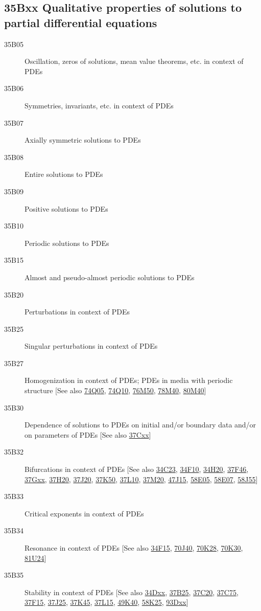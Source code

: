 \documentclass[letterpaper]{article}
\begin{document}
\subsection*{35Bxx  Qualitative properties of solutions to partial differential equations }\label{35Bxx}
\begin{description}  
\item [35B05]\label{35B05} Oscillation, zeros of solutions, mean value theorems, etc. in context of PDEs
\item [35B06]\label{35B06} Symmetries, invariants, etc. in context of PDEs 
\item [35B07]\label{35B07} Axially symmetric solutions to PDEs
\item [35B08]\label{35B08} Entire solutions to PDEs
\item [35B09]\label{35B09} Positive solutions to PDEs
\item [35B10]\label{35B10} Periodic solutions  to PDEs
\item [35B15]\label{35B15} Almost and pseudo-almost periodic solutions to PDEs
\item [35B20]\label{35B20} Perturbations in context of PDEs
\item [35B25]\label{35B25} Singular perturbations in context of PDEs
\item [35B27]\label{35B27} Homogenization in context of PDEs; PDEs in media with periodic structure [See also \hyperref[74Q05]{74Q05}, \hyperref[74Q10]{74Q10}, \hyperref[76M50]{76M50}, \hyperref[78M40]{78M40}, \hyperref[80M40]{80M40}]
\item [35B30]\label{35B30} Dependence of solutions to PDEs on initial and/or boundary data and/or on parameters of PDEs [See also \hyperref[37Cxx]{37Cxx}]
\item [35B32]\label{35B32} Bifurcations  in context of PDEs [See also \hyperref[34C23]{34C23}, \hyperref[34F10]{34F10}, \hyperref[34H20]{34H20}, \hyperref[37F46]{37F46}, \hyperref[37Gxx]{37Gxx}, \hyperref[37H20]{37H20},  \hyperref[37J20]{37J20}, \hyperref[37K50]{37K50}, \hyperref[37L10]{37L10}, \hyperref[37M20]{37M20}, \hyperref[47J15]{47J15}, \hyperref[58E05]{58E05}, \hyperref[58E07]{58E07}, \hyperref[58J55]{58J55}]
\item [35B33]\label{35B33} Critical exponents in context of PDEs
\item [35B34]\label{35B34} Resonance in context of PDEs [See also \hyperref[34F15]{34F15}, \hyperref[70J40]{70J40}, \hyperref[70K28]{70K28}, \hyperref[70K30]{70K30}, \hyperref[81U24]{81U24}]
\item [35B35]\label{35B35} Stability in context of PDEs [See also \hyperref[34Dxx]{34Dxx}, \hyperref[37B25]{37B25}, \hyperref[37C20]{37C20}, \hyperref[37C75]{37C75}, \hyperref[37F15]{37F15}, \hyperref[37J25]{37J25}, \hyperref[37K45]{37K45}, \hyperref[37L15]{37L15}, \hyperref[49K40]{49K40}, \hyperref[58K25]{58K25}, \hyperref[93Dxx]{93Dxx}]

\end{description}
\end{document}
